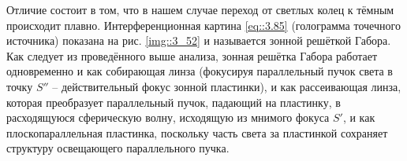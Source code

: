 Отличие состоит в том, что в нашем случае переход от светлых колец к тёмным происходит плавно. 
Интерференционная картина \eqref{eq::3.85} (голограмма точечного источника) показана на
рис. \ref{img::3_52} и называется зонной решёткой Габора. Как следует из проведённого выше анализа, 
зонная решётка Габора работает одновременно и как собирающая линза (фокусируя параллельный пучок 
света в точку $S''$ -- действительный фокус зонной пластинки), и как рассеивающая линза, которая 
преобразует параллельный пучок, падающий на пластинку, в расходящуюся сферическую волну, исходящую из
мнимого фокуса $S'$, и как плоскопараллельная пластинка, поскольку часть света за пластинкой 
сохраняет структуру освещающего параллельного пучка.